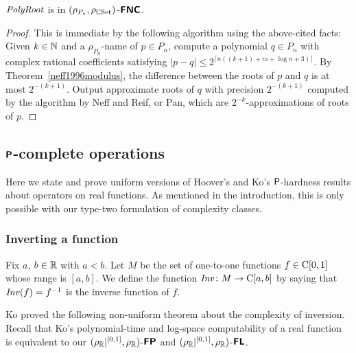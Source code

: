 \documentclass[a4paper,UKenglish]{lipics}
\begin{document}
\begin{theorem}
 \label{theorem:finding-roots-is-in-NC}
 $\mathit{PolyRoot}$ is in $(\rho_{P_*}, \rho_{\mathbb C\mathrm{Set}})$-$\text{\bfseries \sffamily \upshape FNC}$.
\end{theorem}


\begin{proof}
This is immediate by the following algorithm
using the above-cited facts:
Given $k \in \mathbb N$ and a $\rho_{P_n}$-name of $p \in P_n$, 
compute a polynomial $q \in {P_n}$ with complex rational coefficients
satisfying $|p - q| \le 2^{\lceil n((k+1) + m + \log n + 3)\rceil}$.
By Theorem~\ref{neff1996modulus}, the difference between 
the roots of $p$ and $q$ is at most $2^{-(k+1)}$.
Output approximate roots of $q$ with precision $2^{-(k+1)}$ 
computed by the algorithm by Neff and Reif, or Pan,
which are $2^{-k}$-approximations of roots of $p$.
\end{proof}

\subsection{$\text{\bfseries \sffamily \upshape P}$-complete operations}
\label{section:P-complete}

Here we state and prove uniform versions of 
Hoover's and Ko's $\mathsf{P}$-hardness results 
about operators on real functions. 
As mentioned in the introduction, 
this is only possible with our type-two formulation of complexity classes. 

\enlargethispage{4pt}

\subsubsection{Inverting a function}

Fix $a$, $b \in \mathbb R$ with $a < b$. 
Let $M$ be the set of one-to-one functions $f \in \mathrm C[0,1]$
whose range is $[a,b]$.
We define the function $\mathit{Inv} \colon M \to \mathrm C [a, b]$ 
by saying that $\mathit{Inv} (f) = f ^{-1}$ is the inverse function of $f$. 

Ko proved the following non-uniform theorem about the complexity of inversion.
Recall that Ko's polynomial-time and log-space computability of a real function
is equivalent to our $(\rho _\mathbb R|^{[0,1]}, \rho _\mathbb R)$-$\text{\bfseries \sffamily \upshape FP}$ and $(\rho _\mathbb R|^{[0,1]}, \rho _\mathbb R)$-$\text{\bfseries \sffamily \upshape FL}$. 
\end{document}
